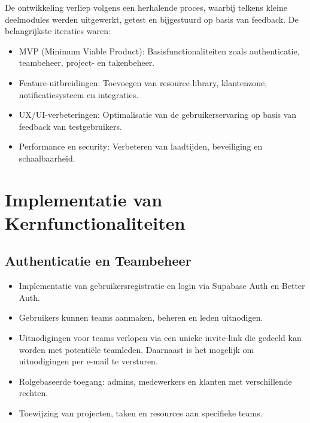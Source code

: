 De ontwikkeling verliep volgens een herhalende proces, waarbij telkens kleine deelmodules werden uitgewerkt, getest en bijgestuurd op basis van feedback. De belangrijkste iteraties waren:
\begin{itemize}
    \item MVP (Minimum Viable Product): Basisfunctionaliteiten zoals authenticatie, teambeheer, project- en takenbeheer.
    \item Feature-uitbreidingen: Toevoegen van resource library, klantenzone, notificatiesysteem en integraties.
    \item UX/UI-verbeteringen: Optimalisatie van de gebruikerservaring op basis van feedback van testgebruikers.
    \item Performance en security: Verbeteren van laadtijden, beveiliging en schaalbaarheid.
\end{itemize}

\section{Implementatie van Kernfunctionaliteiten}
\label{sec:implementatie-kern}

\subsection{Authenticatie en Teambeheer}
\begin{itemize}
    \item Implementatie van gebruikersregistratie en login via Supabase Auth en Better Auth.
    \item Gebruikers kunnen teams aanmaken, beheren en leden uitnodigen.
    \item Uitnodigingen voor teams verlopen via een unieke invite-link die gedeeld kan worden met potentiële teamleden. Daarnaast is het mogelijk om uitnodigingen per e-mail te versturen.
    \item Rolgebaseerde toegang: admins, medewerkers en klanten met verschillende rechten.
    \item Toewijzing van projecten, taken en resources aan specifieke teams.
\end{itemize}

